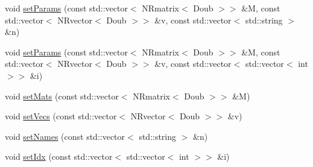 \begin{DoxyCompactItemize}
\item 
void \hyperlink{struct_p_r_p_s_evolution_1_1_models_1_1_whole_tomato_mk_i_i___b_a5d272a1f5eb4bba6948237ce9ab701f4}{set\-Params} (const std\-::vector$<$ \-N\-Rmatrix$<$ \-Doub $>$$>$ \&\-M, const std\-::vector$<$ \-N\-Rvector$<$ \-Doub $>$$>$ \&v, const std\-::vector$<$ std\-::string $>$ \&n)
\item 
void \hyperlink{struct_p_r_p_s_evolution_1_1_models_1_1_whole_tomato_mk_i_i___b_a85dd22fbc540004be6ddcea08bd91bfa}{set\-Params} (const std\-::vector$<$ \-N\-Rmatrix$<$ \-Doub $>$$>$ \&\-M, const std\-::vector$<$ \-N\-Rvector$<$ \-Doub $>$$>$ \&v, const std\-::vector$<$ std\-::vector$<$ int $>$$>$ \&i)
\item 
void \hyperlink{struct_p_r_p_s_evolution_1_1_models_1_1_whole_tomato_mk_i_i___b_afa941d2941011e4e23ea38c550181ef3}{set\-Mats} (const std\-::vector$<$ \-N\-Rmatrix$<$ \-Doub $>$$>$ \&\-M)
\item 
void \hyperlink{struct_p_r_p_s_evolution_1_1_models_1_1_whole_tomato_mk_i_i___b_a5484944e6ac6be94c1bc76a263380f24}{set\-Vecs} (const std\-::vector$<$ \-N\-Rvector$<$ \-Doub $>$$>$ \&v)
\item 
void \hyperlink{struct_p_r_p_s_evolution_1_1_models_1_1_whole_tomato_mk_i_i___b_ab21970f0d7c9f6d7c81efba5486c8d55}{set\-Names} (const std\-::vector$<$ std\-::string $>$ \&n)
\item 
void \hyperlink{struct_p_r_p_s_evolution_1_1_models_1_1_whole_tomato_mk_i_i___b_a99c2c06410b4d4ff064c9f57ebc94070}{set\-Idx} (const std\-::vector$<$ std\-::vector$<$ int $>$$>$ \&i)
\end{DoxyCompactItemize}


